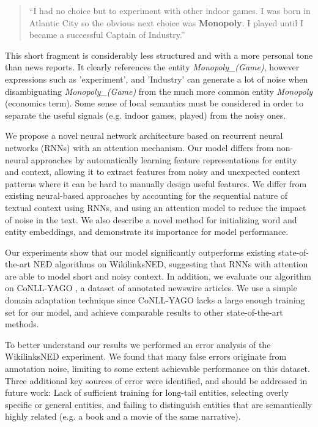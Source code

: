 \documentclass[11pt]{article}
\begin{document}
	\begin{quote}
		``I had no choice but to experiment with other indoor games. I was born in Atlantic City so the obvious next choice was \textbf{Monopoly}. I played until I became a successful Captain of Industry.''
	\end{quote}
	
	This short fragment is considerably less structured and with a more personal tone than news reports. It clearly references the entity \textit{Monopoly\_(Game)}, however expressions such as 'experiment', and 'Industry' can generate a lot of noise when disambiguating \textit{Monopoly\_(Game)} from the much more common entity \textit{Monopoly} (economics term). Some sense of local semantics must be considered in order to separate the useful signals (e.g. indoor games, played) from the noisy ones.
	
	
	We propose a novel neural network architecture based on recurrent neural networks (RNNs) with an attention mechanism. Our model differs from non-neural approaches by automatically learning feature representations for entity and context, allowing it to extract features from noisy and unexpected context patterns where it can be hard to manually design useful features. We differ from existing neural-based approaches by accounting for the sequential nature of textual context using RNNs, and using an attention model to reduce the impact of noise in the text. We also describe a novel method for initializing word and entity embeddings, and demonstrate its importance for model performance. 
	
	Our experiments show that our model significantly outperforms existing state-of-the-art NED algorithms on WikilinksNED, suggesting that RNNs with attention are able to model short and noisy context. In addition, we evaluate our algorithm on CoNLL-YAGO \cite{hoffart2011robust}, a dataset of annotated newswire articles. We use a simple domain adaptation technique since CoNLL-YAGO lacks a large enough training set for our model, and achieve comparable results to other state-of-the-art methods. 
	
	To better understand our results we performed an error analysis of the WikilinksNED experiment. We found that many false errors originate from annotation noise, limiting to some extent achievable performance on this dataset. Three additional key sources of error were identified, and should be addressed in future work: Lack of sufficient training for long-tail entities, selecting overly specific or general entities, and failing to distinguish entities that are semantically highly related (e.g. a book and a movie of the same narrative). 
	
\end{document}
